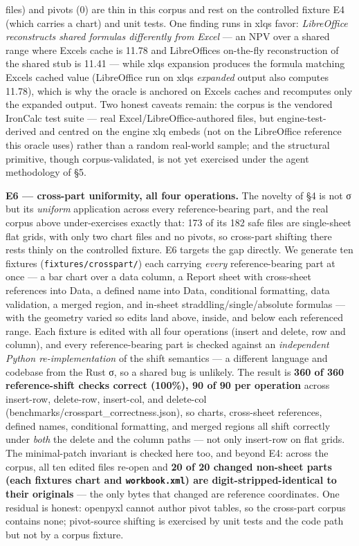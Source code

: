 \documentclass[
]{article}
\newcounter{none} %
\begin{document}
files) and pivots (0) are thin in this corpus and rest on the controlled
fixture E4 (which carries a chart) and unit tests. One finding runs in
xlq\textquotesingle s favor: \emph{LibreOffice reconstructs shared
formulas differently from Excel} --- an NPV over a shared range where
Excel\textquotesingle s cache is 11.78 and LibreOffice\textquotesingle s
on-the-fly reconstruction of the shared stub is 11.41 --- while
xlq\textquotesingle s expansion produces the formula matching
Excel\textquotesingle s cached value (LibreOffice run on
xlq\textquotesingle s \emph{expanded} output also computes 11.78), which
is why the oracle is anchored on Excel\textquotesingle s caches and
recomputes only the expanded output. Two honest caveats remain: the
corpus is the vendored IronCalc test suite --- real
Excel/LibreOffice-authored files, but engine-test-derived and centred on
the engine xlq embeds (not on the LibreOffice reference this oracle
uses) rather than a random real-world sample; and the structural
primitive, though corpus-validated, is not yet exercised under the agent
methodology of §5.

\textbf{E6 --- cross-part uniformity, all four operations.} The novelty
of §4 is not σ but its \emph{uniform} application across every
reference-bearing part, and the real corpus above under-exercises
exactly that: 173 of its 182 safe files are single-sheet flat grids,
with only two chart files and no pivots, so cross-part shifting there
rests thinly on the controlled fixture. E6 targets the gap directly. We
generate ten fixtures (\texttt{fixtures/crosspart/}) each carrying
\emph{every} reference-bearing part at once --- a bar chart over a data
column, a Report sheet with cross-sheet references into Data, a defined
name into Data, conditional formatting, data validation, a merged
region, and in-sheet straddling/single/absolute formulas --- with the
geometry varied so edits land above, inside, and below each referenced
range. Each fixture is edited with all four operations (insert and
delete, row and column), and every reference-bearing part is checked
against an \emph{independent Python re-implementation} of the shift
semantics --- a different language and codebase from the Rust σ, so a
shared bug is unlikely. The result is \textbf{360 of 360 reference-shift
checks correct (100\%), 90 of 90 per operation} across insert-row,
delete-row, insert-col, and delete-col
(benchmarks/crosspart\_correctness.json), so charts, cross-sheet
references, defined names, conditional formatting, and merged regions
all shift correctly under \emph{both} the delete and the column paths
--- not only insert-row on flat grids. The minimal-patch invariant is
checked here too, and beyond E4: across the corpus, all ten edited files
re-open and \textbf{20 of 20 changed non-sheet parts (each
fixture\textquotesingle s chart and \texttt{workbook.xml}) are
digit-stripped-identical to their originals} --- the only bytes that
changed are reference coordinates. One residual is honest: openpyxl
cannot author pivot tables, so the cross-part corpus contains none;
pivot-source shifting is exercised by unit tests and the code path but
not by a corpus fixture.
\end{document}

